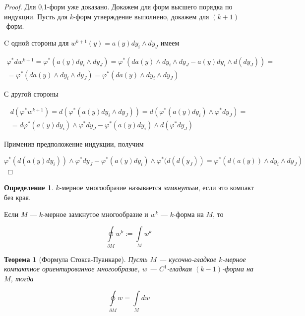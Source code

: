 \documentclass[a5paper]{article}
\newcounter{through}
\theoremstyle{plain}
\newtheorem{theorem}[through]{Теорема}
\theoremstyle{definition}
\newtheorem{definition}[through]{Определение}
\numberwithin{through}{section}
\numberwithin{equation}{section}
\begin{document}
\begin{proof}
	Для 0,1-форм уже доказано. Докажем для форм высшего порядка по индукции.
	Пусть для $k$-форм утверждение выполнено, докажем для $(k+1)$-форм.
	
	C одной стороны для $w^{k+1} (y) = a(y) dy_i \wedge dy_J$ имеем
	
	\begin{multline*}
		\varphi^* d w^{k+1} = \varphi^* (a(y) dy_i \wedge dy_J) = \varphi^*(da(y) \wedge dy_i \wedge dy_J - a(y) dy_i \wedge d(dy_J)) = \\ = \varphi^* (da(y) \wedge dy_i \wedge dy_J) = \varphi^* (da(y) \wedge dy_i \wedge dy_J)
	\end{multline*}
	
	С другой стороны
	
	\begin{multline*}
		d(\varphi^* w^{k+1}) = d(\varphi^* (a(y) dy_i \wedge dy_J)) = d(\varphi^* (a(y) dy_i) \wedge \varphi^* dy_J) = \\ = d\varphi^* (a(y) dy_i) \wedge \varphi^* dy_J - \varphi^* (a(y) dy_i) \wedge d(\varphi^* dy_J)
	\end{multline*}
	
	Применив предположение индукции, получим
		
	\begin{equation*}
	\varphi^* (d(a(y) dy_i)) \wedge \varphi^* dy_J - \varphi^* (a(y) dy_i) \wedge \varphi^* (d(d(y_J)) = \varphi^* (d(a(y)) \wedge dy_i \wedge dy_J)
	\end{equation*}
\end{proof}

\begin{definition}
	$k$-мерное многообразие называется \textit{замкнутым}, если это компакт без края.
\end{definition}

Если $M$ --- $k$-мерное замкнутое многообразие и $w^k$ --- $k$-форма на $M$, то

\begin{equation*}
	\oint\limits_{\partial M} w^k := \int\limits_{M} w^k %
\end{equation*}

\begin{theorem}[Формула Стокса-Пуанкаре]
	Пусть $M$ --- кусочно-гладкое $k$-мерное компактное ориентированное многообразие, $w$ --- $C^1$-гладкая $(k-1)$-форма на $M$, тогда
	
	\begin{equation*}
	\oint\limits_{\partial M} w = \int\limits_{M} dw
	\end{equation*}
\end{theorem}
\end{document}
